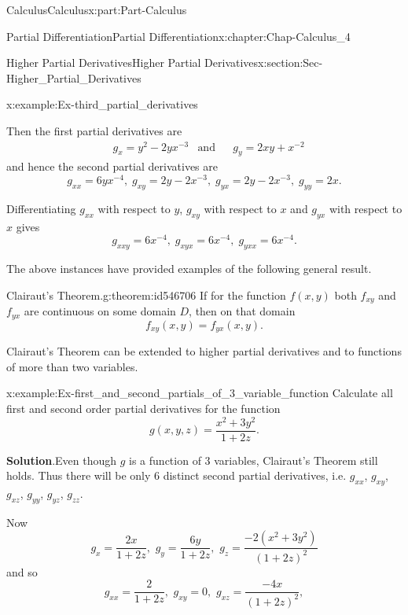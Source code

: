 \documentclass[oneside,10pt,]{book}
\newcommand{\blocktitlefont}{\relax}
\numberwithin{equation}{section}
\newcommand{\amp}{&}
\begin{document}
\begin{partptx}{Calculus}{}{Calculus}{}{}{x:part:Part-Calculus}
\begin{chapterptx}{Partial Differentiation}{}{Partial Differentiation}{}{}{x:chapter:Chap-Calculus_4}
\begin{sectionptx}{Higher Partial Derivatives}{}{Higher Partial Derivatives}{}{}{x:section:Sec-Higher_Partial_Derivatives}
\begin{example}{}{x:example:Ex-third_partial_derivatives}
%
\par
Then the first partial derivatives are%
\begin{align*}
\amp g_x = y^2 - 2yx^{-3} \amp \text{and} \amp \amp g_y = 2xy+x^{-2}
\end{align*}
and hence the second partial derivatives are%
\begin{equation*}
g_{xx}=6yx^{-4}, \;  g_{xy} = 2y-2x^{-3}, \;  g_{yx} = 2y-2x^{-3}, \; g_{yy} = 2x\text{.}
\end{equation*}
%
\par
Differentiating \(g_{xx}\) with respect to \(y\), \(g_{xy}\) with respect to \(x\) and \(g_{yx}\) with respect to \(x\) gives%
\begin{equation*}
g_{xxy} = 6x^{-4}, \; g_{xyx} = 6x^{-4}, \; g_{yxx} = 6x^{-4}\text{.}
\end{equation*}
%
\end{example}
The above instances have provided examples of the following general result.%
\begin{theorem}{Clairaut's Theorem.}{}{g:theorem:id546706}%
If for the function \(f(x,y)\) both \(f_{xy}\) and \(f_{yx}\) are continuous on some domain \(D\), then on that domain%
\begin{equation*}
f_{xy}(x,y) = f_{yx}(x,y)\text{.}
\end{equation*}
%
\end{theorem}
Clairaut’s Theorem can be extended to higher partial derivatives and to functions of more than two variables.%
\begin{example}{}{x:example:Ex-first_and_second_partials_of_3_variable_function}%
Calculate all first and second order partial derivatives for the function%
\begin{equation*}
g(x,y,z) = \dfrac{x^2 + 3y^2}{1+2z}\text{.}
\end{equation*}
%
\par\smallskip%
\noindent\textbf{\blocktitlefont Solution}.\hypertarget{g:solution:id546738}{}\quad{}Even though \(g\) is a function of \(3\) variables, Clairaut's Theorem still holds. Thus there will be only 6 distinct second partial derivatives, i.e. \(g_{xx}\), \(g_{xy}\), \(g_{xz}\), \(g_{yy}\), \(g_{yz}\), \(g_{zz}\).%
\par
Now%
\begin{equation*}
g_x = \dfrac{2x}{1+2z}, \,\, g_y = \dfrac{6y}{1+2z}, \,\, g_z = \dfrac{-2(x^2+3y^2)}{(1+2z)^2}
\end{equation*}
and so%
\begin{equation*}
g_{xx} = \dfrac{2}{1+2z}, \,\, g_{xy} = 0, \,\, g_{xz} = \dfrac{-4x}{(1+2z)^2},

\end{equation*}
\end{example}
\end{sectionptx}
\end{chapterptx}
\end{partptx}
\end{document}
